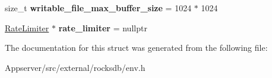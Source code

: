 \begin{DoxyCompactItemize}
\item 
size\+\_\+t {\bfseries writable\+\_\+file\+\_\+max\+\_\+buffer\+\_\+size} = 1024 $\ast$ 1024\hypertarget{structrocksdb_1_1EnvOptions_adaec8cfd73c5ffa7677f803e381a93c1}{}\label{structrocksdb_1_1EnvOptions_adaec8cfd73c5ffa7677f803e381a93c1}

\item 
\hyperlink{classrocksdb_1_1RateLimiter}{Rate\+Limiter} $\ast$ {\bfseries rate\+\_\+limiter} = nullptr\hypertarget{structrocksdb_1_1EnvOptions_a7b400f9a1b10c03af13df7004597da3f}{}\label{structrocksdb_1_1EnvOptions_a7b400f9a1b10c03af13df7004597da3f}

\end{DoxyCompactItemize}


The documentation for this struct was generated from the following file\+:\begin{DoxyCompactItemize}
\item 
Appserver/src/external/rocksdb/env.\+h\end{DoxyCompactItemize}
